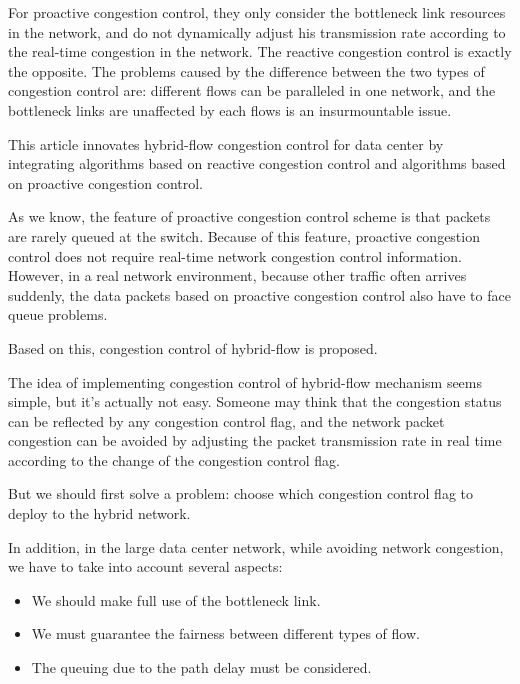 \documentclass[conference]{IEEEtran}
\begin{document}
\indent For proactive congestion control, they only consider the bottleneck link resources in the network, and do not dynamically adjust his transmission rate according to the real-time congestion in the network\cite{perry2015fastpass}\cite{gao2015phost}\cite{cho2017credit}. The reactive congestion control is exactly the opposite.  The problems caused by the difference between the two types of congestion control are: different flows can be paralleled in one network, and the bottleneck links are unaffected by each flows is an insurmountable issue.

\indent This article innovates hybrid-flow congestion control for data center by integrating algorithms based on reactive congestion control and algorithms based on proactive congestion control.

\indent As we know, the feature of proactive congestion control scheme is that packets are rarely queued at the switch. Because of this feature, proactive congestion control does not require real-time network congestion control information. However, in a real network environment, because other traffic often arrives suddenly, the data packets based on proactive congestion control also have to face queue problems.

\indent Based on this, congestion control of hybrid-flow is proposed.

\indent The idea of implementing congestion control of hybrid-flow mechanism seems simple, but it's actually not easy. Someone may think that the congestion status can be reflected by any congestion control flag, and the network packet congestion can be avoided by adjusting the packet transmission rate in real time according to the change of the congestion control flag.

\indent But we should first solve a problem: choose which congestion control flag to deploy to the hybrid network.

\indent In addition, in the large data center network, while avoiding network congestion, we have to take into account several aspects:

\begin{itemize}

\item We should make full use of the bottleneck link.

\item We must guarantee the fairness between different types of flow.

\item The queuing due to the path delay must be considered.

\end{itemize}
\end{document}
